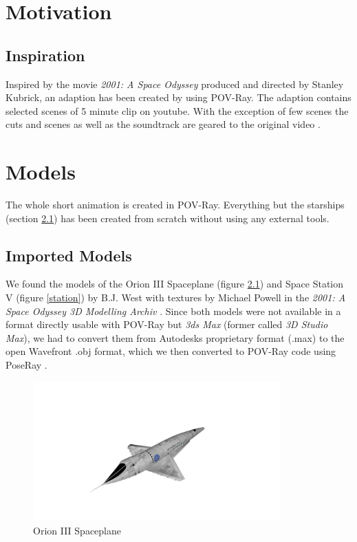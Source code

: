 
\chapter{Motivation}
\section{Inspiration}
Inspired by the movie \textit{2001: A Space Odyssey} produced and directed by Stanley Kubrick, an adaption has been created by using POV-Ray. The adaption contains selected scenes of 5 minute clip on youtube.  With the exception of few scenes the cuts and scenes as well as the soundtrack are geared to the original video \cite{EbClectic}.

\chapter{Models}
The whole short animation is created in POV-Ray. Everything but the starships (section \ref{imported_models}) has been created from scratch without using any external tools.

\section{Imported Models} \label{imported_models}

We found the models of the Orion III Spaceplane (figure \ref{orion}) and Space Station V (figure \ref{station}) by B.J. West with textures by Michael Powell in the \textit{2001: A Space Odyssey 3D Modelling Archiv} \cite{Archive}.
Since both models were not available in a format directly usable with POV-Ray but \textit{3ds Max} (former called \textit{3D Studio Max}), we had to convert them from Autodesks proprietary format (.max) to the open Wavefront .obj format, which we then converted to POV-Ray code using PoseRay \cite{PoseRay}.

\begin{figure}[ht]
	\centering
	\includegraphics[width=0.85\textwidth]{images/orion.jpg}
	\caption{Orion III Spaceplane}
	\label{orion}
\end{figure}

